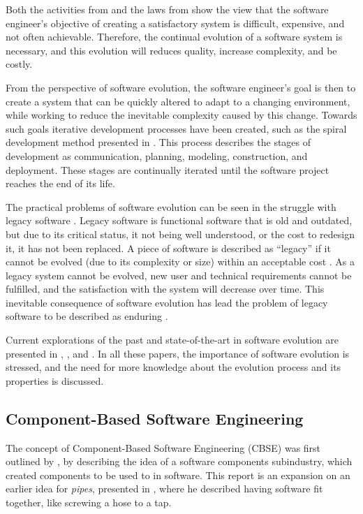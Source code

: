 Both the activities from \cite{Lientz1980} and the laws from \citep{lehman1980} show the view that
the software engineer's objective of creating a satisfactory system is difficult, expensive, and not often achievable.
Therefore, the continual evolution of a software system is necessary, and this evolution will reduces quality, increase complexity, and be costly.

From the perspective of software evolution, the software engineer's goal is then to create a system that can be quickly altered to adapt to a changing environment, 
while working to reduce the inevitable complexity caused by this change.
Towards such goals iterative development processes have been created, such as the spiral development method presented in \citep{Boehm1988}.
This process describes the stages of development as communication, planning, modeling, construction, and deployment. 
These stages are continually iterated until the software project reaches the end of its life. 

The practical problems of software evolution can be seen in the struggle with legacy software \citep{Bennett1995}.
Legacy software is functional software that is old and outdated, but due to its critical status, it not being well understood, or the cost to redesign it, 
it has not been replaced.
A piece of software is described as ``legacy'' if it cannot be evolved  (due to its complexity or size) within an acceptable cost \citep{Bisbal1999}.
As a legacy system cannot be evolved, new user and technical requirements cannot be fulfilled, and the satisfaction with the system will decrease over time.
This inevitable consequence of software evolution has lead the problem of legacy software to be described as enduring \citep{Bennett2000}. 

Current explorations of the past and state-of-the-art in software evolution are presented in \citep{Bennett2000}, \citep{Lehman2003}, and \citep{Godfrey2008}.
In all these papers, the importance of software evolution is stressed, and the need for more knowledge about the evolution process and its properties is discussed.

\subsection{Component-Based Software Engineering}
The concept of Component-Based Software Engineering (CBSE) was first outlined by \cite{McIlroy1969}, 
by describing the idea of a software components subindustry, which created components to be used to in software.
This report is an expansion on an earlier idea for \textit{pipes}, presented in \citep{mcilroy1964pipes}, 
where he described having software fit together, like screwing a hose to a tap.

